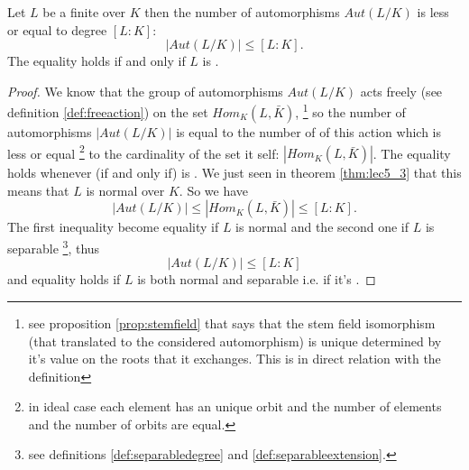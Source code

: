 \begin{theorem}
  Let $L$ be a finite over $K$ then the number of automorphisms
  $Aut\left(L/K\right)$ is less or equal to degree
  $\left[L:K\right]$:
  \[
  \left|Aut\left(L/K\right)\right| \le \left[L:K\right].
  \]
  The equality holds if and only if $L$ is
  .
  \begin{proof}
    We know that the group of automorphisms $Aut\left(L/K\right)$ acts
    freely (see definition \ref{def:freeaction}) on the set
    $Hom_K\left(L, \bar{K}\right)$,
    \footnote{
      see proposition \ref{prop:stemfield} that says that the stem
      field isomorphism (that translated to the considered
      automorphism) is unique determined by it's value on the roots that
      it exchanges. This is in direct relation with the
       definition
    }
    so the number of 
    automorphisms $\left|Aut\left(L/K\right)\right|$ is equal to the
    number of  of this action which is less or
    equal
    \footnote{
      in ideal case each element has an unique orbit and the number of
      elements and the number of orbits are equal.
    }
    to the cardinality of the set it self:
    $\left|Hom_K\left(L, \bar{K}\right)\right|$. The equality holds
    whenever (if and only if)  is . We
    just seen in 
    theorem \ref{thm:lec5_3} that this means that $L$ is normal over
    $K$. So we have
    \[
    \left|Aut\left(L/K\right)\right| \le
    \left|Hom_K\left(L, \bar{K}\right)\right| \le
    \left[L:K\right].
    \]
    The first inequality become equality if $L$ is normal and the
    second one if $L$ is separable
    \footnote{
      see definitions \ref{def:separabledegree} and \ref{def:separableextension}.
    }, thus
    \[
    \left|Aut\left(L/K\right)\right| \le \left[L:K\right]
    \]
    and equality holds if $L$ is both normal and separable i.e. if
    it's .
  \end{proof}
  \label{thm:lec5_4}
\end{theorem}

